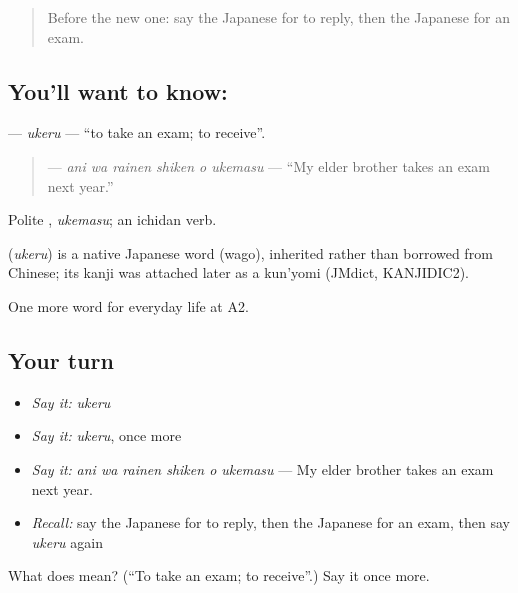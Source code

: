 \begin{quote}
Before the new one: say the Japanese for to reply, then the Japanese for an exam.
\end{quote}

\subsection*{You'll want to know: }
\textbf{} — \emph{ukeru} — \textquotedblleft{}to take an exam; to receive\textquotedblright{}.

\begin{quote}
\textbf{   } — \emph{ani wa rainen shiken o ukemasu} — \textquotedblleft{}My elder brother takes an exam next year.\textquotedblright{}
\end{quote}

Polite \textbf{}, \emph{ukemasu}; an ichidan verb.

\begin{cousinweb}
\textbf{} (\emph{ukeru}) is a native Japanese word (wago), inherited rather than borrowed from Chinese; its kanji was attached later as a kun'yomi (JMdict, KANJIDIC2).
\end{cousinweb}

\begin{grammarlens}[title={What you've built}]
One more word for everyday life at A2.
\end{grammarlens}

\subsection*{Your turn}
\begin{itemize}
\raggedright
  \item \emph{Say it:} \emph{ukeru}
  \item \emph{Say it:} \emph{ukeru}, once more
  \item \emph{Say it:} \emph{ani wa rainen shiken o ukemasu} — My elder brother takes an exam next year.
  \item \emph{Recall:} say the Japanese for to reply, then the Japanese for an exam, then say \emph{ukeru} again
\end{itemize}

\begin{tcolorbox}[breakable,colback=teal!4,colframe=teal!35!black,title={Before you move on}]
What does  mean? (\textquotedblleft{}To take an exam; to receive\textquotedblright{}.) Say it once more.
\end{tcolorbox}
